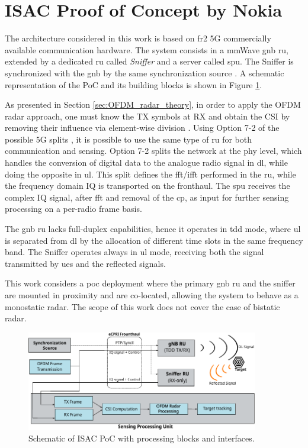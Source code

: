	
	

\section{ISAC Proof of Concept by Nokia}
\label{sec:intro-PoCarchitecture}

The architecture considered in this work is based on \gls{fr2} 5G commercially available communication hardware.
The system consists in a mmWave \gls{gnb} \gls{ru}, extended by a dedicated \gls{ru} called \textit{Sniffer} and a server called \gls{spu}. 
The Sniffer is synchronized with the \gls{gnb} by the same synchronization source \cite{Wild_Grudnitsky_Mandelli_Henninger_Guan_Schaich_2023}. 
A schematic representation of the PoC and its building blocks is shown in Figure \ref{fig:Overview_PoC_scheme}.

As presented in Section \ref{sec:OFDM_radar_theory}, in order to apply the OFDM radar approach, one must know the TX symbols at RX and obtain the CSI by removing their influence via element-wise division \cite{Braun2014OFDMRA}. 
Using Option 7-2 of the possible 5G splits \cite{Larsen_Checko_Christiansen_2019}, it is possible to use the same type of \gls{ru} for both communication and sensing.
Option 7-2 splits the network at the \gls{phy} level, which handles the conversion of digital data to the analogue radio signal in \gls{dl}, while doing the opposite in \gls{ul}.
This split defines the \gls{fft}/\gls{ifft} performed in the \gls{ru}, while the frequency domain IQ is transported on the fronthaul.
The \gls{spu} receives the complex IQ signal,  after \gls{fft} and removal of the \gls{cp}, as input for further sensing processing on a per-radio frame basis.

The \gls{gnb} \gls{ru} lacks full-duplex capabilities, hence it operates in \gls{tdd} mode, where \gls{ul} is separated from \gls{dl} by the allocation of different time slots in the same frequency band.
The Sniffer operates always in \gls{ul} mode, receiving both the signal transmitted by \glspl{ue} and the reflected signals. 

This work considers a \gls{poc} deployment where the primary \gls{gnb} \gls{ru} and the sniffer are mounted in proximity and are co-located, allowing the system to behave as a monostatic radar. 
The scope of this work does not cover the case of bistatic radar.

\begin{figure}[t]
	\centering
	\includegraphics[width=0.9\textwidth]{Images/overview/PoC_scheme.pdf}
	\caption{Schematic of ISAC PoC with processing blocks and interfaces. }
	\label{fig:Overview_PoC_scheme}
\end{figure}

